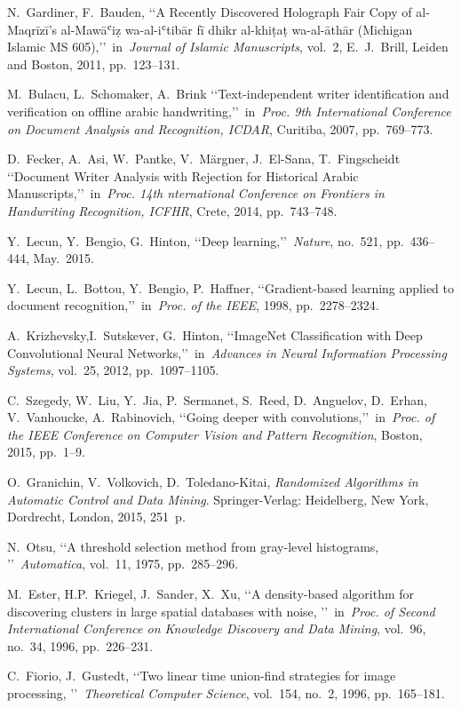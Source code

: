 \documentclass[conference,a4paper,twocolumn]{IEEEtran}
\begin{document}
\begin{thebibliography}{99}

 N.~Gardiner, F.~Bauden, \lq\lq A Recently Discovered Holograph Fair Copy of al-Maqrīzī’s al-Mawāʿiẓ wa-al-iʿtibār fī dhikr al-khiṭaṭ wa-al-āthār (Michigan Islamic MS 605),\rq\rq~in~\emph{Journal of Islamic Manuscripts}, vol.~2, E.~J.~Brill, Leiden and Boston, 2011, pp.~123--131.

 M.~Bulacu, L.~Schomaker, A.~Brink \lq\lq Text-independent writer identification and verification on offline arabic handwriting,\rq\rq~in~\emph{Proc. 9th International Conference on Document Analysis and Recognition, ICDAR}, Curitiba, 2007, pp.~769--773.

 D.~Fecker, A.~Asi, W.~Pantke, V.~Märgner, J.~El-Sana, T.~Fingscheidt \lq\lq Document Writer Analysis with Rejection for Historical Arabic Manuscripts,\rq\rq~in~\emph{Proc. 14th nternational Conference on Frontiers in Handwriting Recognition, ICFHR}, Crete, 2014, pp.~743--748.

 Y.~Lecun, Y.~Bengio, G.~Hinton, \lq\lq Deep learning,\rq\rq~\emph{Nature}, no.~521, pp.~436--444, May.~2015.

 Y.~Lecun, L.~Bottou, Y.~Bengio, P.~Haffner, \lq\lq Gradient-based learning applied to document recognition,\rq\rq~in~\emph{Proc. of the IEEE}, 1998, pp.~2278--2324.

 A.~Krizhevsky,I.~Sutskever, G.~Hinton, \lq\lq ImageNet Classification with Deep Convolutional Neural Networks,\rq\rq~in~\emph{Advances in Neural Information Processing Systems}, vol.~25, 2012, pp.~1097--1105.

 C.~Szegedy, W.~Liu, Y.~Jia, P.~Sermanet, S.~Reed, D.~Anguelov, D.~Erhan, V.~Vanhoucke, A.~Rabinovich, \lq\lq Going deeper with convolutions,\rq\rq~in~\emph{Proc. of the IEEE Conference on Computer Vision and Pattern Recognition}, Boston, 2015, pp.~1--9.

 O.~Granichin, V.~Volkovich, D.~Toledano-Kitai, \emph{Randomized Algorithms in Automatic Control and Data Mining}. Springer-Verlag: Heidelberg, New York, Dordrecht, London, 2015, 251~p.

 N.~Otsu, \lq\lq A threshold selection method from gray-level histograms, \rq\rq~\emph{Automatica}, vol.~11, 1975, pp.~285--296.

 M.~Ester, H.P.~Kriegel, J.~Sander, X.~Xu, \lq\lq A density-based algorithm for discovering clusters in large spatial databases with noise, \rq\rq~in~\emph{Proc. of Second International
Conference on Knowledge Discovery and Data Mining}, vol.~96, no.~34, 1996, pp.~226--231.

 C.~Fiorio, J.~Gustedt, \lq\lq Two linear time union-find strategies for image processing, \rq\rq~\emph{Theoretical Computer Science}, vol.~154, no.~2, 1996, pp.~165--181.

\end{thebibliography}


\end{document}
